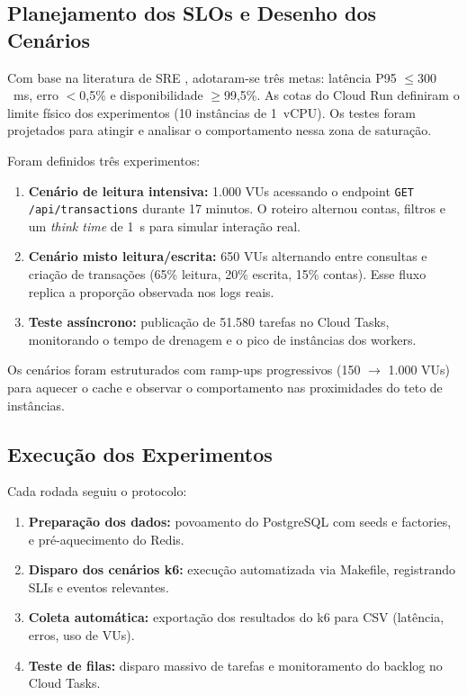 \subsection{Planejamento dos SLOs e Desenho dos Cenários}

Com base na literatura de SRE \cite{mccoy_slo_2020,google_sre_book_main}, adotaram-se três metas:
latência P95 $\leq 300$~ms, erro $<$0{,}5\% e disponibilidade $\geq$99,5\%.
As cotas do Cloud Run definiram o limite físico dos experimentos (10 instâncias de 1~vCPU).
Os testes foram projetados para atingir e analisar o comportamento nessa zona de saturação.

Foram definidos três experimentos:

\begin{enumerate}
    \item \textbf{Cenário de leitura intensiva:} 1.000 VUs acessando o endpoint
        \texttt{GET /api/transactions} durante 17 minutos. O roteiro alternou contas,
        filtros e um \textit{think time} de 1~s para simular interação real.

    \item \textbf{Cenário misto leitura/escrita:} 650 VUs alternando entre consultas e criação de transações
        (65\% leitura, 20\% escrita, 15\% contas). Esse fluxo replica a proporção observada nos logs reais.

    \item \textbf{Teste assíncrono:} publicação de 51.580 tarefas no Cloud Tasks, monitorando
        o tempo de drenagem e o pico de instâncias dos workers.
\end{enumerate}

Os cenários foram estruturados com ramp-ups progressivos (150 $\rightarrow$ 1.000 VUs)
para aquecer o cache e observar o comportamento nas proximidades do teto de instâncias.

\subsection{Execução dos Experimentos}

Cada rodada seguiu o protocolo:

\begin{enumerate}
    \item \textbf{Preparação dos dados:} povoamento do PostgreSQL com seeds e factories, e pré-aquecimento do Redis.
    \item \textbf{Disparo dos cenários k6:} execução automatizada via Makefile, registrando SLIs e eventos relevantes.
    \item \textbf{Coleta automática:} exportação dos resultados do k6 para CSV (latência, erros, uso de VUs).
    \item \textbf{Teste de filas:} disparo massivo de tarefas e monitoramento do backlog no Cloud Tasks.
\end{enumerate}

